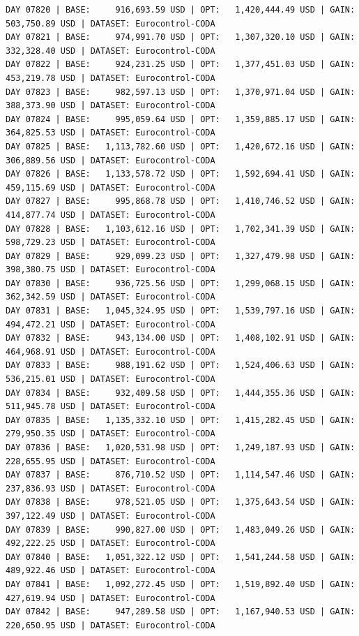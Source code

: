 \documentclass[11pt,a4paper]{article}
\begin{document}
\begin{verbatim}
DAY 07820 | BASE:     916,693.59 USD | OPT:   1,420,444.49 USD | GAIN: 503,750.89 USD | DATASET: Eurocontrol-CODA
DAY 07821 | BASE:     974,991.70 USD | OPT:   1,307,320.10 USD | GAIN: 332,328.40 USD | DATASET: Eurocontrol-CODA
DAY 07822 | BASE:     924,231.25 USD | OPT:   1,377,451.03 USD | GAIN: 453,219.78 USD | DATASET: Eurocontrol-CODA
DAY 07823 | BASE:     982,597.13 USD | OPT:   1,370,971.04 USD | GAIN: 388,373.90 USD | DATASET: Eurocontrol-CODA
DAY 07824 | BASE:     995,059.64 USD | OPT:   1,359,885.17 USD | GAIN: 364,825.53 USD | DATASET: Eurocontrol-CODA
DAY 07825 | BASE:   1,113,782.60 USD | OPT:   1,420,672.16 USD | GAIN: 306,889.56 USD | DATASET: Eurocontrol-CODA
DAY 07826 | BASE:   1,133,578.72 USD | OPT:   1,592,694.41 USD | GAIN: 459,115.69 USD | DATASET: Eurocontrol-CODA
DAY 07827 | BASE:     995,868.78 USD | OPT:   1,410,746.52 USD | GAIN: 414,877.74 USD | DATASET: Eurocontrol-CODA
DAY 07828 | BASE:   1,103,612.16 USD | OPT:   1,702,341.39 USD | GAIN: 598,729.23 USD | DATASET: Eurocontrol-CODA
DAY 07829 | BASE:     929,099.23 USD | OPT:   1,327,479.98 USD | GAIN: 398,380.75 USD | DATASET: Eurocontrol-CODA
DAY 07830 | BASE:     936,725.56 USD | OPT:   1,299,068.15 USD | GAIN: 362,342.59 USD | DATASET: Eurocontrol-CODA
DAY 07831 | BASE:   1,045,324.95 USD | OPT:   1,539,797.16 USD | GAIN: 494,472.21 USD | DATASET: Eurocontrol-CODA
DAY 07832 | BASE:     943,134.00 USD | OPT:   1,408,102.91 USD | GAIN: 464,968.91 USD | DATASET: Eurocontrol-CODA
DAY 07833 | BASE:     988,191.62 USD | OPT:   1,524,406.63 USD | GAIN: 536,215.01 USD | DATASET: Eurocontrol-CODA
DAY 07834 | BASE:     932,409.58 USD | OPT:   1,444,355.36 USD | GAIN: 511,945.78 USD | DATASET: Eurocontrol-CODA
DAY 07835 | BASE:   1,135,332.10 USD | OPT:   1,415,282.45 USD | GAIN: 279,950.35 USD | DATASET: Eurocontrol-CODA
DAY 07836 | BASE:   1,020,531.98 USD | OPT:   1,249,187.93 USD | GAIN: 228,655.95 USD | DATASET: Eurocontrol-CODA
DAY 07837 | BASE:     876,710.52 USD | OPT:   1,114,547.46 USD | GAIN: 237,836.93 USD | DATASET: Eurocontrol-CODA
DAY 07838 | BASE:     978,521.05 USD | OPT:   1,375,643.54 USD | GAIN: 397,122.49 USD | DATASET: Eurocontrol-CODA
DAY 07839 | BASE:     990,827.00 USD | OPT:   1,483,049.26 USD | GAIN: 492,222.25 USD | DATASET: Eurocontrol-CODA
DAY 07840 | BASE:   1,051,322.12 USD | OPT:   1,541,244.58 USD | GAIN: 489,922.46 USD | DATASET: Eurocontrol-CODA
DAY 07841 | BASE:   1,092,272.45 USD | OPT:   1,519,892.40 USD | GAIN: 427,619.94 USD | DATASET: Eurocontrol-CODA
DAY 07842 | BASE:     947,289.58 USD | OPT:   1,167,940.53 USD | GAIN: 220,650.95 USD | DATASET: Eurocontrol-CODA

\end{verbatim}
\end{document}
